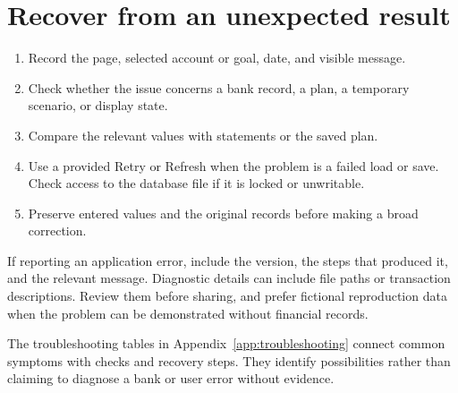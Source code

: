 \section{Recover from an unexpected result}
\begin{enumerate}
\item Record the page, selected account or goal, date, and visible message.
\item Check whether the issue concerns a bank record, a plan, a temporary scenario, or display state.
\item Compare the relevant values with statements or the saved plan.
\item Use a provided Retry or Refresh when the problem is a failed load or save. Check access to the database file if it is locked or unwritable.
\item Preserve entered values and the original records before making a broad correction.
\end{enumerate}

If reporting an application error, include the version, the steps that produced it, and the relevant message. Diagnostic details can include file paths or transaction descriptions. Review them before sharing, and prefer fictional reproduction data when the problem can be demonstrated without financial records.

The troubleshooting tables in Appendix~\ref{app:troubleshooting} connect common symptoms with checks and recovery steps. They identify possibilities rather than claiming to diagnose a bank or user error without evidence.


